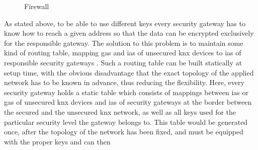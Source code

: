 \begin{figure}
  \centering
 \caption{Firewall}
 \label{fig:firewall}
\end{figure}
As stated above, to be able to use different keys every security gateway has to know how to reach a given address so that the data can be encrypted
exclusively for the responsible gateway. The solution to this problem is to maintain some kind of routing table, mapping \glspl{ga} and \glspl{ia} of unsecured
\gls{knx} devices to \glspl{ia} of responsible security gateways	.
Such a routing table can be built statically at setup time, with the obvious disadvantage
that the exact topology of the applied network has to be known in advance, thus reducing the flexibility. Here, every security gateway holds a static 
table which consists of mappings between \glspl{ia} or \glspl{ga} of unsecured \gls{knx} devices and \glspl{ia} of security gateways at the border
between the secured and the unsecured \gls{knx} network, as well as all keys used for the particular security level the gateway belongs to.
This table would be generated once, after the topology of the network has been fixed, and must be equipped with the proper keys and can then
